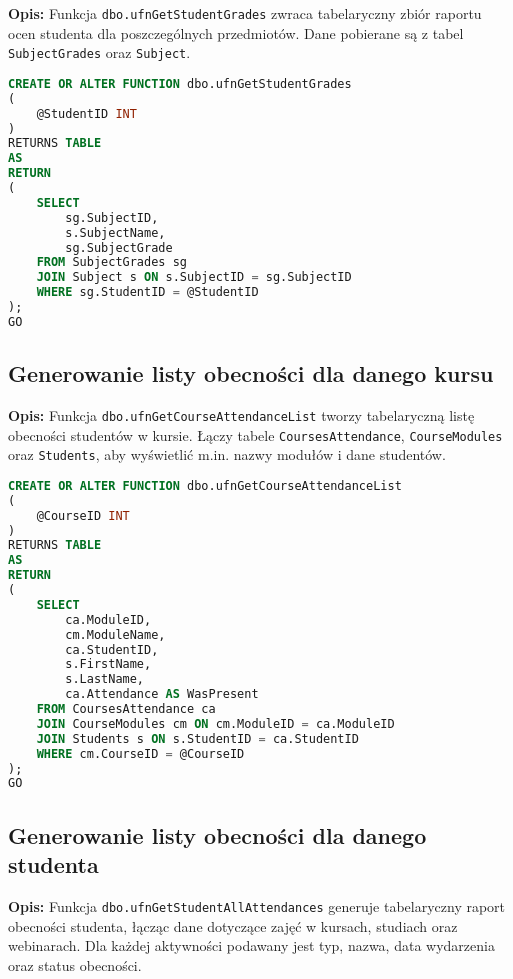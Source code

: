 \documentclass[12pt]{article}
\begin{document}
\textbf{Opis:} Funkcja \texttt{dbo.ufnGetStudentGrades} zwraca tabelaryczny zbiór raportu ocen studenta dla poszczególnych przedmiotów. Dane pobierane są z tabel \texttt{SubjectGrades} oraz \texttt{Subject}.

 
\begin{lstlisting}[language=SQL]
CREATE OR ALTER FUNCTION dbo.ufnGetStudentGrades
(
    @StudentID INT
)
RETURNS TABLE
AS
RETURN
(
    SELECT 
        sg.SubjectID,
        s.SubjectName,
        sg.SubjectGrade
    FROM SubjectGrades sg
    JOIN Subject s ON s.SubjectID = sg.SubjectID
    WHERE sg.StudentID = @StudentID
);
GO
\end{lstlisting}

\subsection{Generowanie listy obecności dla danego kursu}
\label{sec:course_attendance_list}

\textbf{Opis:} Funkcja \texttt{dbo.ufnGetCourseAttendanceList} tworzy tabelaryczną listę obecności studentów w kursie. Łączy tabele \texttt{CoursesAttendance}, \texttt{CourseModules} oraz \texttt{Students}, aby wyświetlić m.in. nazwy modułów i dane studentów.

 
\begin{lstlisting}[language=SQL]
CREATE OR ALTER FUNCTION dbo.ufnGetCourseAttendanceList
(
    @CourseID INT
)
RETURNS TABLE
AS
RETURN
(
    SELECT 
        ca.ModuleID,
        cm.ModuleName,
        ca.StudentID,
        s.FirstName,
        s.LastName,
        ca.Attendance AS WasPresent
    FROM CoursesAttendance ca
    JOIN CourseModules cm ON cm.ModuleID = ca.ModuleID
    JOIN Students s ON s.StudentID = ca.StudentID
    WHERE cm.CourseID = @CourseID
);
GO
\end{lstlisting}
\newpage
\subsection{Generowanie listy obecności dla danego studenta}
\label{sec:student_all_attendances}

\textbf{Opis:} Funkcja \texttt{dbo.ufnGetStudentAllAttendances} generuje tabelaryczny raport obecności studenta, łącząc dane dotyczące zajęć w kursach, studiach oraz webinarach. Dla każdej aktywności podawany jest typ, nazwa, data wydarzenia oraz status obecności.
\end{document}
